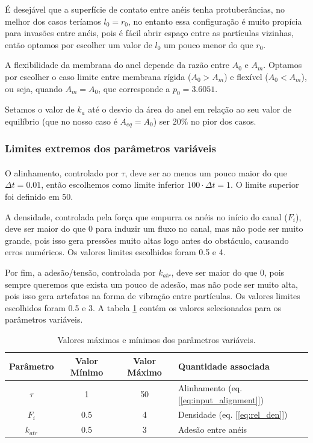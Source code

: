 \documentclass{article}
\theoremstyle{definition}
\begin{document}
É desejável que a superfície de contato entre anéis tenha protuberâncias, no melhor dos casos teríamos $l_0 = r_0$, no entanto essa configuração é muito propícia para invasões entre anéis, pois é fácil abrir espaço entre as partículas vizinhas, então optamos por escolher um valor de $l_0$ um pouco menor do que $r_0$.

A flexibilidade da membrana do anel depende da razão entre $A_0$ e $A_m$. Optamos por escolher o caso limite entre membrana rígida ($A_0 > A_m$) e flexível ($A_0 < A_m$), ou seja, quando $A_m = A_0$, que corresponde a $p_0 = 3.6051$.

Setamos o valor de $k_a$ até o desvio da área do anel em relação ao seu valor de equilíbrio (que no nosso caso é $A_{eq}=A_0$) ser $20\%$ no pior dos casos.

\subsubsection{Limites extremos dos parâmetros variáveis}
\paragraph{}
O alinhamento, controlado por $\tau$, deve ser ao menos um pouco maior do que $\Delta t = 0.01$, então escolhemos como limite inferior $100 \cdot \Delta t = 1$. O limite superior foi definido em 50.

A densidade, controlada pela força que empurra os anéis no início do canal ($F_i$), deve ser maior do que 0 para induzir um fluxo no canal, mas não pode ser muito grande, pois isso gera pressões muito altas logo antes do obstáculo, causando erros numéricos. Os valores limites escolhidos foram 0.5 e 4.

Por fim, a adesão/tensão, controlada por $k_{atr}$, deve ser maior do que 0, pois sempre queremos que exista um pouco de adesão, mas não pode ser muito alta, pois isso gera artefatos na forma de vibração entre partículas. Os valores limites escolhidos foram 0.5 e 3. 
A tabela \ref{tab:extreme_pars_values} contém os valores selecionados para os parâmetros variáveis.

\begin{table}[h]
    \centering
    \begin{tabular}{||c|c|c|l||}
        \hline
         Parâmetro& Valor Mínimo & Valor Máximo & Quantidade associada \\ \hline \hline
         $\tau$ & 1 & 50 & Alinhamento (eq. [\ref{eq:input_alignment}]) \\ \hline
         $F_i$ & 0.5 & 4 & Densidade (eq. [\ref{eq:rel_den}])\\ \hline
         $k_{atr}$ & 0.5 & 3 & Adesão entre anéis \\ \hline
    \end{tabular}
    \caption{Valores máximos e mínimos dos parâmetros variáveis.}
    \label{tab:extreme_pars_values}
\end{table}
\end{document}
